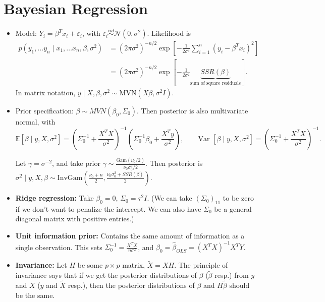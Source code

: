 \documentclass[twoside]{article}
\newcommand{\dis}{\displaystyle}
\newcommand\bbE{\mathbb{E}}
\newcommand\calN{\mathcal{N}}
\def\eps{\varepsilon}
\newcommand\sg{\sigma}
\newcommand\Sg{\Sigma}
\newcommand\var{\text{Var }}
\begin{document}
\section{Bayesian Regression}
\begin{itemize}
\item Model: $Y_i = \beta^T x_i + \eps_i$, with $\eps_i \stackrel{iid}{\sim} \calN(0, \sg^2)$. Likelihood is 
\begin{align*} p(y_1, \dots y_n \mid x_1, \dots x_n, \beta, \sg^2) &= (2\pi \sg^2)^{-n/2} \exp \left[ -\dis\frac{1}{2\sg^2}\sum_{i=1}^n (y_i - \beta^T x_i)^2 \right] \\ 
&= (2\pi \sg^2)^{-n/2} \exp \left[ -\dis\frac{1}{2\sg^2} \underbrace{SSR(\beta)}_{\text{sum of square residuals}} \right].
\end{align*}
In matrix notation, $y \mid X, \beta, \sg^2 \sim \text{MVN}(X\beta, \sg^2 I)$.

\item Prior specification: $\beta \sim MVN(\beta_0, \Sg_0)$. Then posterior is also multivariate normal, with
\begin{equation*}
\bbE [\beta \mid y, X, \sg^2] = \left(\Sg_0^{-1} + \frac{X^T X}{\sg^2} \right)^{-1} \left(\Sg_0^{-1}\beta_0 + \frac{X^T y}{\sg^2} \right), \qquad 
\var [\beta \mid y, X, \sg^2] = \left(\Sg_0^{-1} + \frac{X^T X}{\sg^2} \right)^{-1}.
\end{equation*}

Let $\gamma = \sg^{-2}$, and take prior $\gamma \sim \dis\frac{\text{Gam}(\nu_0/2)}{\nu_0 \sg_0^2 / 2}$. Then posterior is $\sg^2 \mid y, X, \beta \sim \text{InvGam}\left( \dis\frac{\nu_0 + n}{2}, \frac{\nu_0 \sg_0^2 + SSR(\beta)}{2}\right)$.

\item \textbf{Ridge regression:} Take $\beta_0 = 0$, $\Sg_0 = \tau^2 I$. (We can take $(\Sg_0)_{11}$ to be zero if we don't want to penalize the intercept. We can also have $\Sg_0$ be a general diagonal matrix with positive entries.)

\item \textbf{Unit information prior:} Contains the same amount of information as a single observation. This sets $\Sg_0^{-1} = \dis\frac{X^T X}{n\sg^2}$, and $\beta_0 = \hat{\beta}_{OLS} = (X^T X)^{-1} X^T Y$.

\item \textbf{Invariance:} Let $H$ be some $p \times p$ matrix, $\tilde{X} = XH$. The principle of invariance says that if we get the posterior distributions of $\beta$ ($\tilde{\beta}$ resp.) from $y$ and $X$ ($y$ and $\tilde{X}$ resp.), then the posterior distributions of $\beta$ and $H \tilde{\beta}$ should be the same.


\end{itemize}
\end{document}
